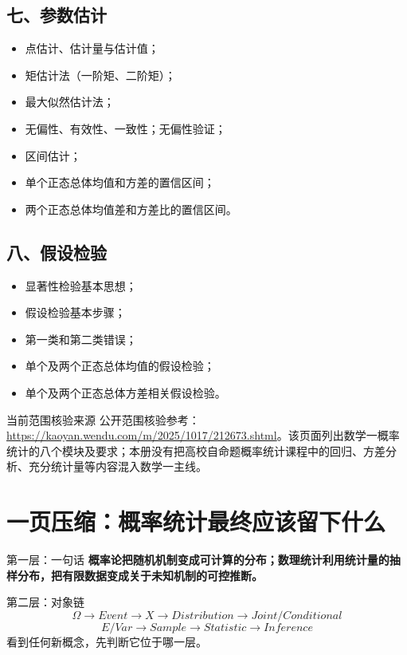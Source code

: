 \documentclass[11pt,a4paper,openany]{ctexbook}
\begin{document}
\section*{七、参数估计}
\begin{itemize}
\item 点估计、估计量与估计值；
\item 矩估计法（一阶矩、二阶矩）；
\item 最大似然估计法；
\item 无偏性、有效性、一致性；无偏性验证；
\item 区间估计；
\item 单个正态总体均值和方差的置信区间；
\item 两个正态总体均值差和方差比的置信区间。
\end{itemize}

\section*{八、假设检验}
\begin{itemize}
\item 显著性检验基本思想；
\item 假设检验基本步骤；
\item 第一类和第二类错误；
\item 单个及两个正态总体均值的假设检验；
\item 单个及两个正态总体方差相关假设检验。
\end{itemize}

\begin{methodbox}{当前范围核验来源}
公开范围核验参考：\url{https://kaoyan.wendu.com/m/2025/1017/212673.shtml}。该页面列出数学一概率统计的八个模块及要求；本册没有把高校自命题概率统计课程中的回归、方差分析、充分统计量等内容混入数学一主线。
\end{methodbox}

\chapter{一页压缩：概率统计最终应该留下什么}

\begin{corebox}{第一层：一句话}
\textbf{概率论把随机机制变成可计算的分布；数理统计利用统计量的抽样分布，把有限数据变成关于未知机制的可控推断。}
\end{corebox}

\begin{corebox}{第二层：对象链}
\[
\boxed{\Omega\to Event\to X\to Distribution\to Joint/Conditional}
\]
\[
\boxed{E/Var\to Sample\to Statistic\to Inference}
\]
看到任何新概念，先判断它位于哪一层。
\end{corebox}
\end{document}
